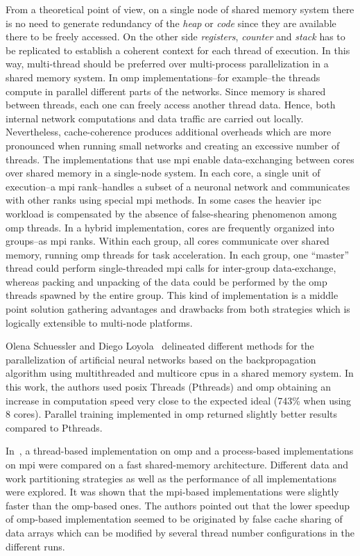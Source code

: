 \documentclass[10pt,journal,compsoc]{IEEEtran}
\begin{document}
From a theoretical point of view, on a single node of shared memory system there is no need to generate redundancy of the \emph{heap} or \emph{code} since they are available there to be freely accessed. On the other side \emph{registers}, \emph{counter} and \emph{stack} has to be replicated to establish a coherent context for each thread of execution. In this way, multi-thread should be preferred over multi-process parallelization in a shared memory system. In \gls{omp} implementations--for example--the threads compute in parallel different parts of the networks. Since memory is shared between threads, each one can freely access another thread data. Hence, both internal network computations and data traffic are carried out locally. Nevertheless, cache-coherence produces additional overheads which are more pronounced when running small networks and creating an excessive number of threads. The implementations that use \gls{mpi} enable data-exchanging between cores over shared memory in a single-node system. In each core, a single unit of execution--a \gls{mpi} rank--handles a subset of a neuronal network and communicates with other ranks using special \gls{mpi} methods. In some cases the heavier \gls{ipc} workload is compensated by the absence of false-shearing phenomenon among \gls{omp} threads. In a hybrid implementation, cores are frequently organized into groups--as \gls{mpi} ranks. Within each group, all cores communicate over shared memory, running \gls{omp} threads for task acceleration. In each group, one “master” thread could perform single-threaded \gls{mpi} calls for inter-group data-exchange, whereas packing and unpacking of the data could be performed by the \gls{omp} threads spawned by the entire group. This kind of implementation is a middle point solution gathering advantages and drawbacks from both strategies which is logically extensible to multi-node platforms.

Olena Schuessler and Diego Loyola~\cite{Schuessler:2011:PTA:1997052.1997062} delineated different methods for the parallelization of artificial neural networks based on the backpropagation algorithm using multithreaded and multicore \glspl{cpu} in a shared memory system. In this work, the authors used \gls{posix} Threads (Pthreads) and \gls{omp} obtaining an increase in computation speed very close to the expected ideal (743\% when using 8 cores). Parallel training implemented in \gls{omp} returned slightly better results compared to Pthreads.

In~\cite{Strey2003ACO}, a thread-based implementation on \gls{omp} and a process-based implementations on \gls{mpi} were compared on a fast shared-memory architecture. Different data and work partitioning strategies as well as the performance of all implementations were explored. It was shown that the \gls{mpi}-based implementations were slightly faster than the \gls{omp}-based ones. The authors pointed out that the lower speedup of \gls{omp}-based implementation seemed to be originated by false cache sharing of data arrays which can be modified by several thread number configurations in the different runs.
\end{document}
